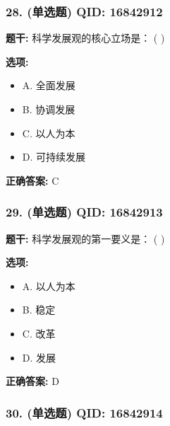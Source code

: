 \documentclass[12pt,UTF8]{ctexart}
\begin{document}
\subsubsection*{28. (单选题) \small QID: 16842912}

\textbf{题干:}
科学发展观的核心立场是： ( )

\textbf{选项:}
\begin{itemize}[leftmargin=*]

  \item A. 全面发展

  \item B. 协调发展

  \item C. 以人为本

  \item D. 可持续发展

\end{itemize}

\textbf{正确答案:}
C

\vspace{0.3em}\hrulefill\vspace{0.7em}

\subsubsection*{29. (单选题) \small QID: 16842913}

\textbf{题干:}
科学发展观的第一要义是： ( )

\textbf{选项:}
\begin{itemize}[leftmargin=*]

  \item A. 以人为本

  \item B. 稳定

  \item C. 改革

  \item D. 发展

\end{itemize}

\textbf{正确答案:}
D

\vspace{0.3em}\hrulefill\vspace{0.7em}

\subsubsection*{30. (单选题) \small QID: 16842914}
\end{document}
